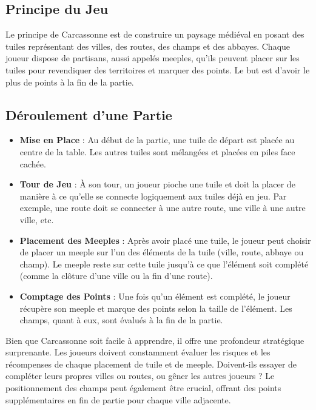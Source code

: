 \documentclass[10pt]{article}
\begin{document}
\subsection{Principe du Jeu}
Le principe de Carcassonne est de construire un paysage médiéval en posant des tuiles représentant des villes, des routes, des champs et des abbayes. Chaque joueur dispose de partisans, aussi appelés meeples, qu'ils peuvent placer sur les tuiles pour revendiquer des territoires et marquer des points. Le but est d'avoir le plus de points à la fin de la partie.

\subsection{Déroulement d'une Partie}
\begin{itemize}
    \item \textbf{Mise en Place} : Au début de la partie, une tuile de départ est placée au centre de la table. Les autres tuiles sont mélangées et placées en piles face cachée.
    \item \textbf{Tour de Jeu} : À son tour, un joueur pioche une tuile et doit la placer de manière à ce qu'elle se connecte logiquement aux tuiles déjà en jeu. Par exemple, une route doit se connecter à une autre route, une ville à une autre ville, etc.
    \item \textbf{Placement des Meeples} : Après avoir placé une tuile, le joueur peut choisir de placer un meeple sur l'un des éléments de la tuile (ville, route, abbaye ou champ). Le meeple reste sur cette tuile jusqu'à ce que l'élément soit complété (comme la clôture d'une ville ou la fin d'une route).
    \item \textbf{Comptage des Points} : Une fois qu'un élément est complété, le joueur récupère son meeple et marque des points selon la taille de l'élément. Les champs, quant à eux, sont évalués à la fin de la partie.
\end{itemize}




Bien que Carcassonne soit facile à apprendre, il offre une profondeur stratégique surprenante. Les joueurs doivent constamment évaluer les risques et les récompenses de chaque placement de tuile et de meeple. Doivent-ils essayer de compléter leurs propres villes ou routes, ou gêner les autres joueurs ? Le positionnement des champs peut également être crucial, offrant des points supplémentaires en fin de partie pour chaque ville adjacente.
\end{document}
